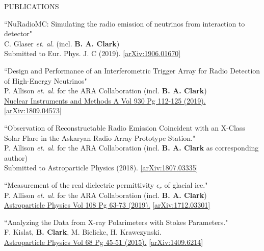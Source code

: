 \documentclass{resume} %
\begin{document}
\begin{rSection}{PUBLICATIONS}
\begin{etaremune}%
  \item ``NuRadioMC: Simulating the radio emission of neutrinos from interaction to detector" \\
 C. Glaser {\it et. al.} (incl. \textbf{B. A. Clark})\\    Submitted to Eur. Phys. J. C (2019). \href{https://arxiv.org/abs/1906.01670}{[arXiv:1906.01670]}
  \item ``Design and Performance of an Interferometric Trigger Array for Radio Detection of High-Energy Neutrinos" \\
 P. Allison {\it et. al.} for the ARA Collaboration (incl. \textbf{B. A. Clark}) \\    \href{https://doi.org/10.1016/j.nima.2019.01.067}{Nuclear Instruments and Methods A Vol 930 Pg 112-125 (2019).}  \href{https://arxiv.org/abs/1809.04573}{[arXiv:1809.04573]}
 \item ``Observation of Reconstructable Radio Emission Coincident with an X-Class Solar Flare in the Askaryan Radio Array Prototype Station." \\
 P. Allison {\it et. al.} for the ARA Collaboration (incl. \textbf{B. A. Clark} as corresponding author) \\
 Submitted to Astroparticle Physics (2018). \href{https://arxiv.org/abs/1807.03335}{[arXiv:1807.03335]}
  \item ``Measurement of the real dielectric permittivity $\epsilon_r$ of glacial ice." \\
 P. Allison {\it et. al.} for the ARA Collaboration (incl. \textbf{B. A. Clark}) \\
  \href{https://doi.org/10.1016/j.astropartphys.2019.01.004}{Astroparticle Physics Vol 108 Pg 63-73 (2019).} \href{https://arxiv.org/abs/1712.03301}{[arXiv:1712.03301]} 
   \item ``Analyzing the Data from X-ray Polarimeters with Stokes Parameters." \\
 F. Kislat,  \textbf{B. Clark}, M. Bielicke, H. Krawczynski.  \\
  \href{http://dx.doi.org/10.1016/j.astropartphys.2015.02.007}{Astroparticle Physics Vol 68 Pg 45-51 (2015).} \href{https://arxiv.org/abs/1409.6214}{[arXiv:1409.6214]} 
 \end{etaremune}
\end{rSection}
\end{document}

